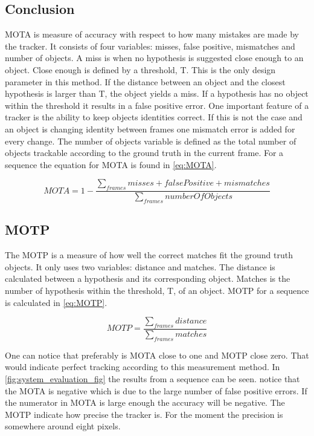 \subsection{Conclusion}
MOTA is measure of accuracy with respect to how many mistakes are made by the tracker. It consists of four variables: misses, false positive, mismatches and number of objects. A miss is when no hypothesis is suggested close enough to an object. Close enough is defined by a threshold, T. This is the only design parameter in this method. If the distance between an object and the closest hypothesis is larger than T, the object yields a miss. If a hypothesis has no object within the threshold it results in a false positive error. One important feature of a tracker is the ability to keep objects identities correct. If this is not the case and an object is changing identity between frames one mismatch error is added for every change. The number of objects variable is defined as the total number of objects trackable according to the ground truth in the current frame. For a sequence the equation for MOTA is found in \eqref{eq:MOTA}.

\begin{equation}
\label{eq:MOTA}
MOTA = 1 - \frac{\sum_{frames}{misses + false Positive + mismatches}}{\sum_{frames}{number Of Objects}}
\end{equation}	

\subsection{MOTP}
The MOTP is a measure of how well the correct matches fit the ground truth objects. It only uses two variables: distance and matches. The distance is calculated between a hypothesis and its corresponding object. Matches is the number of hypothesis within the 
threshold, T, of an object. MOTP for a sequence is calculated in \eqref{eq:MOTP}.

\begin{equation}
\label{eq:MOTP}
MOTP = \frac{\sum_{frames}{distance}}{\sum_{frames}{matches}}
\end{equation}

One can notice that preferably is MOTA close to one and MOTP close zero. That would indicate perfect tracking according to this measurement method. In \ref{fig:system_evaluation_fig} the results from a sequence can be seen. notice that the MOTA is negative which is due to the large number of false positive errors. If the numerator in MOTA is large enough the accuracy will be negative. The MOTP indicate how precise the tracker is. For the moment the precision is somewhere around eight pixels.


